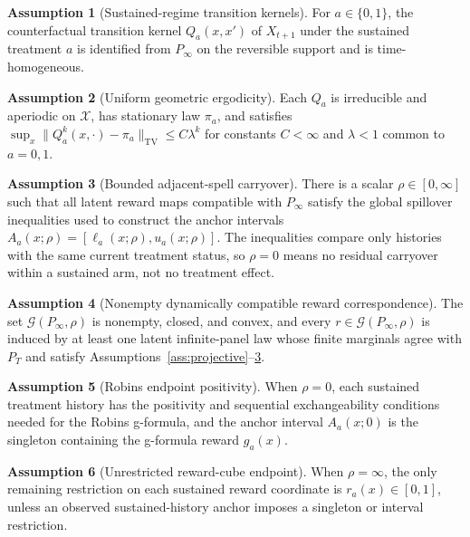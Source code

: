 \documentclass[11pt]{article}
\theoremstyle{definition}
\newtheorem{assumption}{Assumption}
\theoremstyle{plain}
\theoremstyle{remark}
\begin{document}
\begin{assumption}[Sustained-regime transition kernels]\label{ass:transition}
For \(a\in\{0,1\}\), the counterfactual transition kernel \(Q_a(x,x')\) of \(X_{t+1}\) under the sustained treatment \(a\) is identified from \(P_{\infty}\) on the reversible support and is time-homogeneous.
\end{assumption}

\begin{assumption}[Uniform geometric ergodicity]\label{ass:ergodic}
Each \(Q_a\) is irreducible and aperiodic on \(\mathcal X\), has stationary law \(\pi_a\), and satisfies \(\sup_x\|Q_a^k(x,\cdot)-\pi_a\|_{\mathrm{TV}}\le C\lambda^k\) for constants \(C<\infty\) and \(\lambda<1\) common to \(a=0,1\).
\end{assumption}

\begin{assumption}[Bounded adjacent-spell carryover]\label{ass:rho}
There is a scalar \(\rho\in[0,\infty]\) such that all latent reward maps compatible with \(P_{\infty}\) satisfy the global spillover inequalities used to construct the anchor intervals \(A_a(x;\rho)=[\ell_a(x;\rho),u_a(x;\rho)]\).  The inequalities compare only histories with the same current treatment status, so \(\rho=0\) means no residual carryover within a sustained arm, not no treatment effect.
\end{assumption}

\begin{assumption}[Nonempty dynamically compatible reward correspondence]\label{ass:compatible}
The set \(\mathcal G(P_{\infty},\rho)\) is nonempty, closed, and convex, and every \(r\in\mathcal G(P_{\infty},\rho)\) is induced by at least one latent infinite-panel law whose finite marginals agree with \(P_T\) and satisfy Assumptions~\ref{ass:projective}--\ref{ass:rho}.
\end{assumption}

\begin{assumption}[Robins endpoint positivity]\label{ass:robins-endpoint}
When \(\rho=0\), each sustained treatment history has the positivity and sequential exchangeability conditions needed for the Robins g-formula, and the anchor interval \(A_a(x;0)\) is the singleton containing the g-formula reward \(g_a(x)\).
\end{assumption}

\begin{assumption}[Unrestricted reward-cube endpoint]\label{ass:manski-endpoint}
When \(\rho=\infty\), the only remaining restriction on each sustained reward coordinate is \(r_a(x)\in[0,1]\), unless an observed sustained-history anchor imposes a singleton or interval restriction.
\end{assumption}
\end{document}
